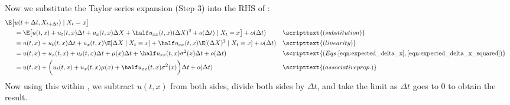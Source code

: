 \documentclass{article} %
\begin{document}
Now we substitute the Taylor series expansion (Step 3)  into the RHS of :
%
\begin{align*}
\E \big[&u( t+ \Delta t, X_{t+\Delta t}) \mid X_t = x\big] \\
&= \E \big[ u(t,x)  + u_t(t,x) \Delta t + u_x(t,x) \Delta X + \half u_{xx}(t,x) (\Delta X)^2+ o(\Delta t)  \mid X_t = x\big] + o(\Delta t) && \scripttext{(substitution)} \\
&= u(t,x)  + u_t(t,x) \Delta t  + u_x(t,x) \E[\Delta X \mid X_t = x] + \half u_{xx}(t,x) \E[(\Delta X)^2 \mid X_t = x] + o(\Delta t) && \scripttext{(linearity)}  \\
&= u(t,x)  + u_x(t,x)  + u_t(t,x) \Delta t + \mu(x) \Delta t +  \half u_{xx}(t,x) \sigma^2(x)\Delta t + o(\Delta t) && \scripttext{(Eqs.\ref{eqn:expected_delta_x},\ref{eqn:expected_delta_x_squared})} \\
&= u(t,x)  + \bigg(u_t(t,x) + u_x(t,x) \mu(x) + \half u_{xx}(t,x) \sigma^2(x) \bigg) \Delta t+  o(\Delta t) && \scripttext{(associative prop.)}  
\end{align*}
%
Now using this within  , we subtract $u(t,x)$ from both sides, divide both sides by $\Delta t$, and take the limit as $\Delta t$ goes to 0 to obtain the result.



{}

\end{document}
